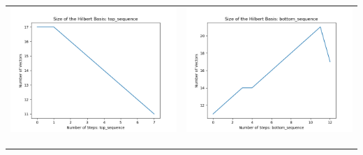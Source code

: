 \documentclass[10pt]{article}
\begin{document}
\begin{tabular}{c|c}
\begin{minipage}{.45\textwidth}
\includegraphics[width=\textwidth]{"DATA/5d/6 generators 2 bound J/top_sequence SIZE"}
\end{minipage} &
\begin{minipage}{.45\textwidth}
\includegraphics[width=\textwidth]{"DATA/5d/6 generators 2 bound J bottomup/bottom_sequence SIZE"}
\end{minipage} \\ \\
\hline \\\begin{minipage}{.45\textwidth}

\end{minipage}
\end{tabular}
\end{document}
